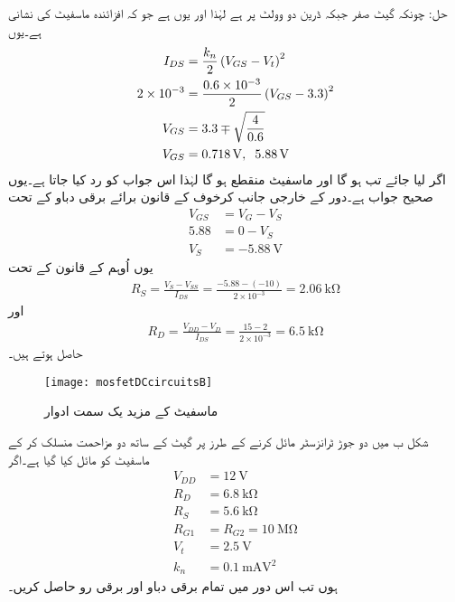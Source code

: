 حل: چونکہ گیٹ صفر جبکہ ڈرین دو وولٹ پر ہے لہٰذا  اور یوں   ہے جو کہ افزائندہ ماسفیٹ کی نشانی ہے۔یوں
\begin{align*}
I_{DS}&=\frac{k_n}{2} \left(V_{GS}-V_t \right )^{2}\\
2 \times 10^{-3}&=\frac{0.6 \times 10^{-3}}{2} \left(V_{GS}-3.3 \right )^{2}\\
V_{GS}&=3.3 \mp \sqrt{\frac{4}{0.6}}\\
V_{GS}&=\SI{0.718}{\volt}, \hspace{2mm} \SI{5.88}{\volt}
\end{align*}
اگر   لیا جائے تب   ہو گا اور ماسفیٹ منقطع ہو گا لہٰذا اس جواب کو رد کیا جاتا ہے۔یوں  صحیح جواب ہے۔دور کے خارجی جانب کرخوف کے قانون برائے برقی دباو کے تحت
\begin{align*}
V_{GS}&=V_G  - V_S\\
5.88&=0-V_S\\
V_S&=\SI{-5.88}{\volt}
\end{align*}
یوں اُوہم کے قانون کے تحت
\begin{align*}
R_S=\frac{V_S-V_{SS}}{I_{DS}}=\frac{-5.88-(-10)}{2 \times 10^{-3}}=\SI{2.06}{\kilo \ohm}
\end{align*}
اور
\begin{align*}
R_D=\frac{V_{DD}-V_{D}}{I_{DS}}=\frac{15-2}{2 \times 10^{-3}}=\SI{6.5}{\kilo \ohm}
\end{align*}
حاصل ہوتے ہیں۔
\begin{figure}
\centering
\texttt{[image: mosfetDCcircuitsB]}
\caption{ماسفیٹ کے مزید یک سمت ادوار}
\label{شکل_ماسفیٹ_کے_یک_سمتی_ادوار_ب}
\end{figure}
شکل  ب میں دو جوڑ ٹرانزسٹر مائل کرنے کے طرز پر گیٹ کے ساتھ دو مزاحمت منسلک کر کے ماسفیٹ کو مائل کیا گیا ہے۔اگر
\begin{align*}
V_{DD}&=\SI{12}{\volt}\\
R_D&=\SI{6.8}{\kilo \ohm}\\
R_S&=\SI{5.6}{\kilo \ohm}\\
R_{G1}&=R_{G2}=\SI{10}{\mega \ohm}\\
V_t&=\SI{2.5}{\volt}\\
k_n&=\SI{0.1}{\milli \ampere \volt \squared}
\end{align*}
ہوں تب اس دور میں تمام برقی دباو اور برقی رو حاصل کریں۔

